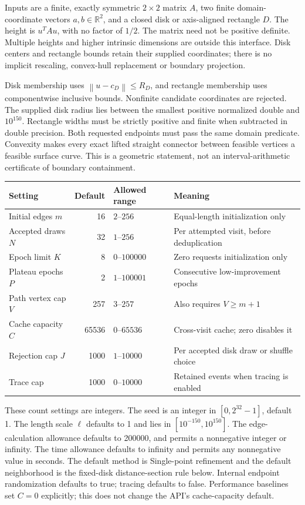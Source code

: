 \documentclass[11pt,letterpaper]{article}
\newcommand{\R}{\mathbb{R}}
\newcommand{\norm}[1]{\left\lVert#1\right\rVert}
\begin{document}
Inputs are a finite, exactly symmetric $2\times2$ matrix $A$, two finite
domain-coordinate vectors $a,b\in\R^2$, and a closed disk or axis-aligned
rectangle $D$. The height is $u^T A u$, with no factor of $1/2$.
The matrix need not be positive definite. Multiple heights and higher
intrinsic dimensions are outside this interface. Disk centers and rectangle
bounds retain their supplied coordinates; there is no implicit rescaling,
convex-hull replacement or boundary projection.

Disk membership uses $\norm{u-c_D}\le R_D$, and rectangle membership uses
componentwise inclusive bounds. Nonfinite candidate coordinates are rejected.
The supplied disk radius lies between the smallest positive normalized
double and $10^{150}$. Rectangle widths must be strictly positive and finite
when subtracted in double precision. Both requested endpoints must pass the
same domain predicate. Convexity makes every exact lifted straight connector
between feasible vertices a feasible surface curve. This is a geometric
statement, not an interval-arithmetic certificate of boundary containment.

\begin{center}\small
\begin{tabularx}{\textwidth}{@{}lrlX@{}}
\toprule
Setting & Default & Allowed range & Meaning \\
\midrule
Initial edges $m$ & 16 & $2$--$256$ & Equal-length initialization only \\
Accepted draws $N$ & 32 & $1$--$256$ & Per attempted visit, before deduplication \\
Epoch limit $K$ & 8 & $0$--$100000$ & Zero requests initialization only \\
Plateau epochs $P$ & 2 & $1$--$100001$ & Consecutive low-improvement epochs \\
Path vertex cap $V$ & 257 & $3$--$257$ & Also requires $V\ge m+1$ \\
Cache capacity $C$ & 65536 & $0$--$65536$ & Cross-visit cache; zero disables it \\
Rejection cap $J$ & 1000 & $1$--$10000$ & Per accepted disk draw or shuffle choice \\
Trace cap & 1000 & $0$--$10000$ & Retained events when tracing is enabled \\
\bottomrule
\end{tabularx}
\end{center}
These count settings are integers. The seed is an integer in
$[0,2^{32}-1]$, default 1. The length scale $\ell$ defaults to 1 and lies in
$[10^{-150},10^{150}]$. The edge-calculation allowance defaults to 200000,
and permits a nonnegative integer or infinity. The time allowance defaults
to infinity and permits any nonnegative value in seconds. The default method
is Single-point refinement and the default neighborhood is the fixed-disk
distance-section rule below. Internal endpoint randomization defaults to true;
tracing defaults to false. Performance baselines set $C=0$ explicitly; this
does not change the API's cache-capacity default.
\end{document}
